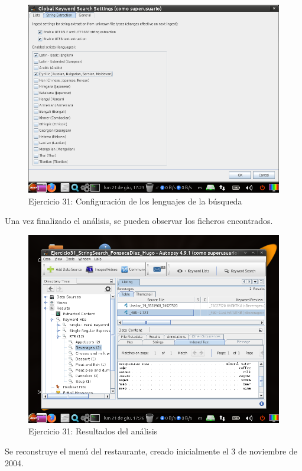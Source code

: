 \documentclass[11pt]{article}
\begin{document}
\begin{figure}[H]
    \caption{Ejercicio 31: Configuración de los lenguajes de la búsqueda}
  \centering
  \includegraphics[scale=0.7]{e31-5.png}
\end{figure}

Una vez finalizado el análisis, se pueden observar los ficheros encontrados.

\begin{figure}[H]
    \caption{Ejercicio 31: Resultados del análisis}
  \centering
  \includegraphics[scale=0.7]{e31-6.png}
\end{figure}

Se reconstruye el menú del restaurante, creado inicialmente el 3 de noviembre de 2004.
\end{document}

